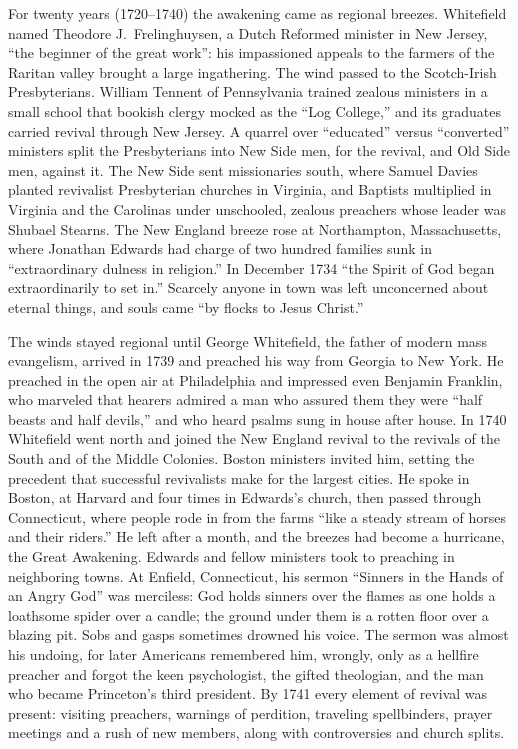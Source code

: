 For twenty years (1720--1740) the awakening came as regional breezes. Whitefield named Theodore
J.~Frelinghuysen, a Dutch Reformed minister in New Jersey, ``the beginner of the great work'': his
impassioned appeals to the farmers of the Raritan valley brought a large ingathering. The wind passed
to the Scotch-Irish Presbyterians. William Tennent of Pennsylvania trained zealous ministers in a
small school that bookish clergy mocked as the ``Log College,'' and its graduates carried revival
through New Jersey. A quarrel over ``educated'' versus ``converted'' ministers split the Presbyterians
into New Side men, for the revival, and Old Side men, against it. The New Side sent missionaries
south, where Samuel Davies planted revivalist Presbyterian churches in Virginia, and Baptists
multiplied in Virginia and the Carolinas under unschooled, zealous preachers whose leader was Shubael Stearns. The New England breeze rose at Northampton, Massachusetts, where Jonathan Edwards had charge of two
hundred families sunk in ``extraordinary dulness in religion.'' In December 1734 ``the Spirit of God
began extraordinarily to set in.'' Scarcely anyone in town was left unconcerned about eternal things,
and souls came ``by flocks to Jesus Christ.''

The winds stayed regional until George Whitefield, the father of modern mass evangelism, arrived in
1739 and preached his way from Georgia to New York. He preached in the open air at Philadelphia and impressed even Benjamin Franklin, who marveled that hearers admired a man who assured them they were
``half beasts and half devils,'' and who heard psalms sung in house after house. In 1740 Whitefield
went north and joined the New England revival to the revivals of the South and of the Middle Colonies. Boston
ministers invited him, setting the precedent that successful revivalists make for the largest cities.
He spoke in Boston, at Harvard and four times in Edwards's church, then passed through Connecticut,
where people rode in from the farms ``like a steady stream of horses and their riders.'' He left
after a month, and the breezes had become a hurricane, the Great Awakening. Edwards and fellow ministers took to preaching in neighboring towns. At Enfield, Connecticut, his sermon
``Sinners in the Hands of an Angry God'' was merciless: God holds sinners over the flames as one
holds a loathsome spider over a candle; the ground under them is a rotten floor over a blazing pit.
Sobs and gasps sometimes drowned his voice. The sermon was almost his undoing, for later Americans
remembered him, wrongly, only as a hellfire preacher and forgot the keen psychologist, the gifted theologian, and the man who became Princeton's third president. By 1741 every element of revival was present:
visiting preachers, warnings of perdition, traveling spellbinders, prayer meetings and a rush of new
members, along with controversies and church splits.

